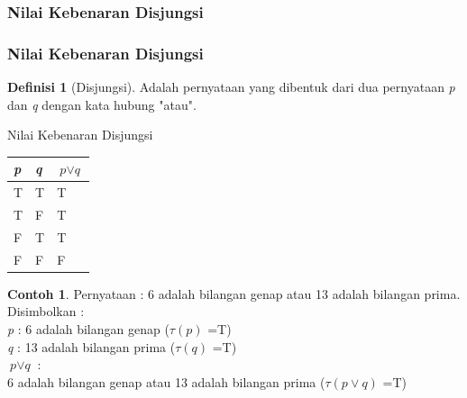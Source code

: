 \documentclass[handout]{beamer}
\theoremstyle{definition}
\newtheorem{definisi}[theorem]{Definisi}
\theoremstyle{example}
\newtheorem{contoh}[theorem]{Contoh}
\begin{document}
\subsubsection{Nilai Kebenaran Disjungsi}
\begin{frame}[shrink]
	\frametitle{Nilai Kebenaran Disjungsi}
	\begin{definisi}[Disjungsi]
		Adalah pernyataan yang dibentuk dari dua pernyataan \textit{p} dan \textit{q} dengan kata hubung "atau".   	
	\end{definisi}
	\begin{block}{Nilai Kebenaran Disjungsi}
		\begin{tabular}{ | l | l | l | }
			\hline
			\textit{p} & \textit{q} & $\textit{p}\vee\textit{q}$ \\ \hline
			T & T & T \\ \hline
			T & F & T \\ \hline
			F & T & T \\ \hline
			F & F & F \\     		 
			\hline
		\end{tabular}
	\end{block}
	
	\begin{contoh}
		Pernyataan : 6 adalah bilangan genap atau 13 adalah bilangan prima.
		 \\
		Disimbolkan :\\
		\textit{p} : 6 adalah bilangan genap ($\tau(\textit{p})$ =T)\\
		\textit{q} : 13 adalah bilangan prima ($\tau(\textit{q})$ =T)\\
		$\textit{p}\vee\textit{q}$ : \\6 adalah bilangan genap atau 13 adalah bilangan prima ($\tau(\textit{p}\vee\textit{q})$ =T)
	\end{contoh}	
	
\end{frame}
\end{document}
